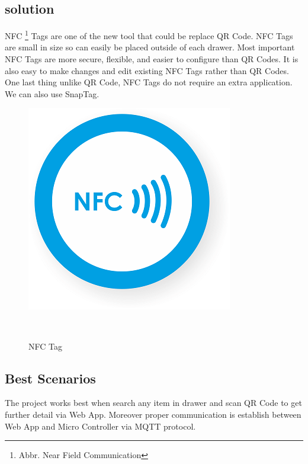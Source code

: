 \begin{itemize}
  	   \subsection{solution}
  	    NFC \footnote{Abbr. Near Field Communication} Tags are one of the new tool that could be replace QR Code. NFC Tags are small in size so can easily be placed outside of each drawer. Most important NFC Tags are more secure, flexible, and easier to configure than QR Codes. It is also easy to make changes and edit existing NFC Tags rather than QR Codes. One last thing unlike QR Code, NFC Tags do not require an extra application. We can also use SnapTag.
\begin{figure}
	\includegraphics[width=0.9\columnwidth]{figures/NFCTag}
	\caption{NFC Tag}~\label{fig:NFC}
\end{figure}
%

\end{itemize}
\subsection{Best Scenarios} 
  The project works best when search any item in drawer and scan QR Code to get further detail via Web App. Moreover proper communication is establish between Web App and Micro Controller via MQTT protocol. 
